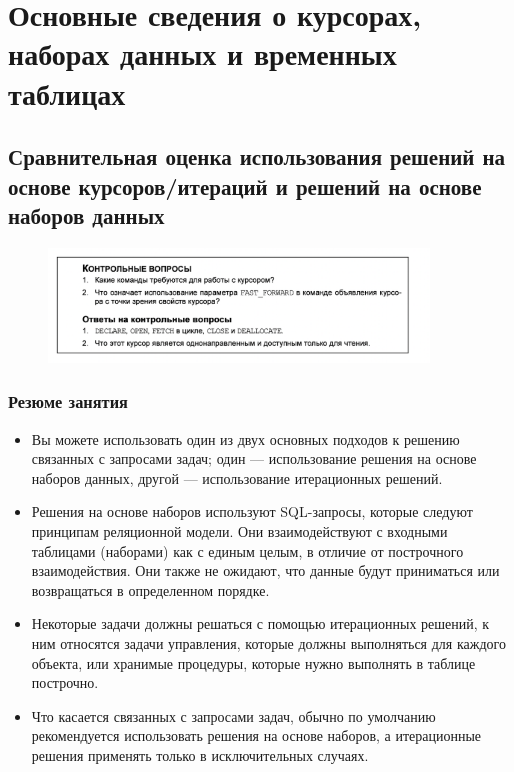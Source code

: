 \chapter{Основные сведения о курсорах, наборах данных и временных таблицах}
\section{Сравнительная оценка использования решений на основе курсоров/итераций и решений на основе наборов данных}


\begin{figure}[h!]
	\begin{center}
		\includegraphics[width=0.9\textwidth]{img/control44.png}
	\end{center}
	\captionsetup{justification=centering}
\end{figure}


\subsection*{Резюме занятия}
\begin{itemize}
	\item Вы можете использовать один из двух основных подходов к решению связанных
	с запросами задач; один — использование решения на основе наборов данных,
	другой — использование итерационных решений. 
	\item Решения на основе наборов используют SQL-запросы, которые следуют принципам реляционной модели. Они взаимодействуют с входными таблицами (наборами) как с единым целым, в отличие от построчного взаимодействия. Они
	также не ожидают, что данные будут приниматься или возвращаться в определенном порядке. 
	\item Некоторые задачи должны решаться с помощью итерационных решений, к ним
	относятся задачи управления, которые должны выполняться для каждого объекта, или хранимые процедуры, которые нужно выполнять в таблице построчно. 
	\item Что касается связанных с запросами задач, обычно по умолчанию рекомендуется использовать решения на основе наборов, а итерационные решения применять только в исключительных случаях. 
\end{itemize}

